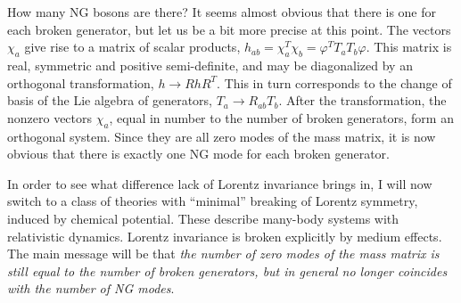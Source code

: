 \documentclass[final,2p,times,12pt,sort&compress]{elsarticle}
\newcommand\vp{\varphi}
\begin{document}
How many NG bosons are there? It seems almost obvious that there is one for
each broken generator, but let us be a bit more precise at this point. The
vectors $\chi_a$ give rise to a matrix of scalar products,
$h_{ab}=\chi^T_a\chi_b=\vp^TT_aT_b\vp$. This matrix is real, symmetric and
positive semi-definite, and may be diagonalized by an orthogonal
transformation, $h\to RhR^T$. This in turn corresponds to the change of basis
of the Lie algebra of generators, $T_a\to R_{ab}T_b$. After the transformation,
the nonzero vectors $\chi_a$, equal in number to the number of broken
generators, form an orthogonal system. Since they are all zero modes of
the mass matrix, it is now obvious that there is exactly one NG mode for each
broken generator.

In order to see what difference lack of Lorentz invariance brings in, I will
now switch to a class of theories with ``minimal'' breaking of Lorentz
symmetry, induced by chemical potential. These describe many-body systems with
relativistic dynamics. Lorentz invariance is broken explicitly by medium
effects. The main message will be that \emph{the number of zero modes of the
mass matrix is still equal to the number of broken generators, but in general no
longer coincides with the number of NG modes}.
\end{document}

